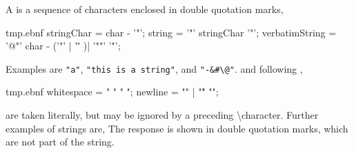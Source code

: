 A  is a sequence of characters enclosed in double quotation marks,
%
\begin{verbatimwrite}{tmp.ebnf}
stringChar = char - '"';
string = '"' { stringChar }  '"';
verbatimString = '@"' {char - ('"' | '\"' )| '""'} '"';
\end{verbatimwrite}
% 
Examples are \lstinline{"a"}, \lstinline{"this is a string"}, and \lstinline{"-&#\@"}.  and following ,
\begin{verbatimwrite}{tmp.ebnf}
whitespace = " " {" "};
newline = "\n" | "\r" "\n";
\end{verbatimwrite}
are taken literally, but may be ignored by a preceding \textbackslash character. Further examples of strings are,
%
%
The response is shown in double quotation marks, which are not part of the string. 

